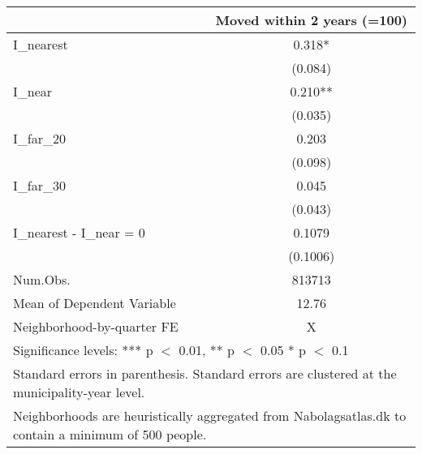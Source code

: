 \centering
\begin{tabular}[t]{lc}
\toprule
  & Moved within 2 years (=100)\\
\midrule
I\_nearest & \num{0.318}*\\
 & (\num{0.084})\\
I\_near & \num{0.210}**\\
 & (\num{0.035})\\
I\_far\_20 & \num{0.203}\\
 & (\num{0.098})\\
I\_far\_30 & \num{0.045}\\
 & (\num{0.043})\\
\midrule
I_{nearest} - I_{near} = 0 & 0.1079\\
 & (0.1006)\\
\midrule
Num.Obs. & \num{813713}\\
Mean of Dependent Variable & 12.76\\
Neighborhood-by-quarter FE & X\\
\bottomrule
\multicolumn{2}{l}{\rule{0pt}{1em}Significance levels: *** p $<$ 0.01, ** p $<$ 0.05 * p $<$ 0.1}\\
\multicolumn{2}{l}{\rule{0pt}{1em}Standard errors in parenthesis. Standard errors are clustered at the municipality-year level.}\\
\multicolumn{2}{l}{\rule{0pt}{1em}Neighborhoods are heuristically aggregated from Nabolagsatlas.dk to contain a minimum of 500 people.}\\
\end{tabular}